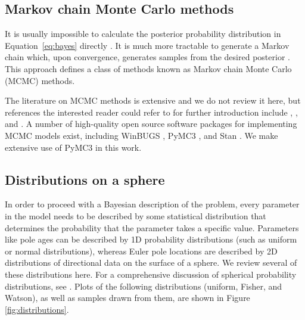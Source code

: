 \documentclass[11pt,letterpaper]{article}
\begin{document}
\subsection*{Markov chain Monte Carlo methods}

It is usually impossible to calculate the posterior probability distribution in Equation~\eqref{eq:bayes} directly \citep{Davidson-Pilon2015a}.  It is much more tractable to generate a Markov chain which, upon convergence, generates samples from the desired posterior \citep{Gelman2013a}. This approach defines a class of methods known as Markov chain Monte Carlo (MCMC) methods.

The literature on MCMC methods is extensive and we do not review it here, but references the interested reader could refer to for further introduction include \cite{Gelman1996a}, \cite{Sambridge2013a}, and \cite{Davidson-Pilon2015a}. A number of high-quality open source software packages for implementing MCMC models exist, including WinBUGS \citep{Lunn2000a}, PyMC3 \citep{Salvatier2016a}, and Stan \citep{Carpenter2017a}. We make extensive use of PyMC3 in this work.

\subsection*{Distributions on a sphere}

In order to proceed with a Bayesian description of the problem, every parameter in the model needs to be described by some statistical distribution that determines the probability that the parameter takes a specific value. Parameters like pole ages can be described by 1D probability distributions (such as uniform or normal distributions), whereas Euler pole locations are described by 2D distributions of directional data on the surface of a sphere. We review several of these distributions here. For a comprehensive discussion of spherical probability distributions, see \cite{Fisher1987b}. Plots of the following distributions (uniform, Fisher, and Watson), as well as samples drawn from them, are shown in Figure \ref{fig:distributions}. 
\end{document}
